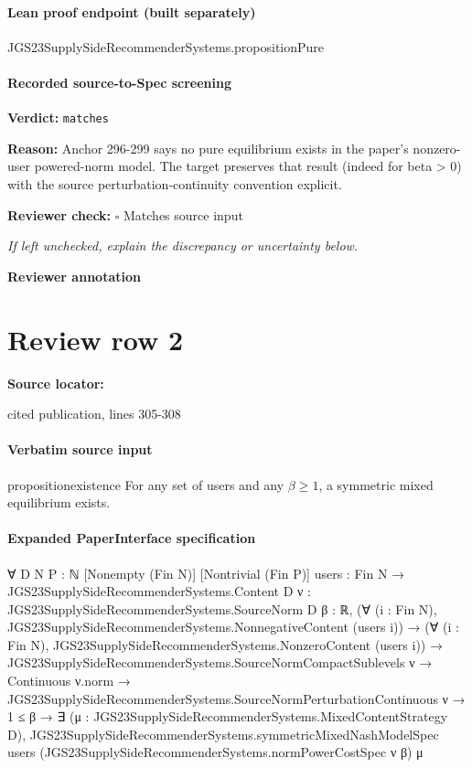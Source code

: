 \documentclass[10pt]{article}
\newcommand{\reviewerbox}{%
  \par\noindent\fbox{\parbox{0.96\linewidth}{\rule{0pt}{0.38in}}}\par
}
\newcommand{\reviewmatch}[1]{%
  \par\noindent\textbf{Reviewer check:} $\square$\; #1\par
  \noindent\emph{If left unchecked, explain the discrepancy or uncertainty below.}\par
}
\begin{document}
\paragraph{Lean proof endpoint (built separately)}\begin{ReviewVerbatim}
JGS23SupplySideRecommenderSystems.propositionPure
\end{ReviewVerbatim}

\paragraph{Recorded source-to-Spec screening}
\textbf{Verdict:} \texttt{matches}
\\
{\raggedright
\textbf{Reason:} Anchor 296-\allowbreak{}299 says no pure equilibrium exists in the paper's nonzero-\allowbreak{}user powered-\allowbreak{}norm model.\allowbreak{}  The target preserves that result (indeed for beta > 0) with the source perturbation-\allowbreak{}continuity convention explicit.\allowbreak{}
\par}
\reviewmatch{Matches source input}
\noindent\textbf{Reviewer annotation}\par
\reviewerbox
\clearpage
\hypertarget{source-claim-eae132c534318172}{}
\section*{Review row 2}
\textbf{Source locator:} {\footnotesize\raggedright cited publication, lines 305-\allowbreak{}308\par}
\paragraph{Verbatim source input}
\begin{ReviewVerbatim}
\begin{restatable}{proposition}{existence}
\label{prop:existence}
For any set of users and any $\beta \ge 1$, a symmetric mixed equilibrium exists.
\end{restatable}
\end{ReviewVerbatim}



\paragraph{Expanded PaperInterface specification}
\begin{ReviewVerbatim}
∀ {D N P : ℕ} [Nonempty (Fin N)] [Nontrivial (Fin P)] {users : Fin N → JGS23SupplySideRecommenderSystems.Content D}
  {ν : JGS23SupplySideRecommenderSystems.SourceNorm D} {β : ℝ},
  (∀ (i : Fin N), JGS23SupplySideRecommenderSystems.NonnegativeContent (users i)) →
    (∀ (i : Fin N), JGS23SupplySideRecommenderSystems.NonzeroContent (users i)) →
      JGS23SupplySideRecommenderSystems.SourceNormCompactSublevels ν →
        Continuous ν.norm →
          JGS23SupplySideRecommenderSystems.SourceNormPerturbationContinuous ν →
            1 ≤ β →
              ∃ (μ : JGS23SupplySideRecommenderSystems.MixedContentStrategy D),
                JGS23SupplySideRecommenderSystems.symmetricMixedNashModelSpec users
                  (JGS23SupplySideRecommenderSystems.normPowerCostSpec ν β) μ
\end{ReviewVerbatim}
\end{document}
